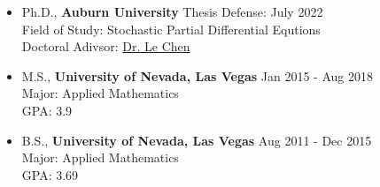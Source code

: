 \documentclass[letterpaper,12pt]{article}
\begin{document}
 \begin{itemize}
   \item  \noindent Ph.D., \textbf{Auburn University} \hfill Thesis Defense: July 2022 \\
   Field of Study: Stochastic Partial Differential Equtions  \\ 
   Doctoral Adivsor: \href{http://webhome.auburn.edu/~lzc0090/}{Dr. Le Chen}
   
   \item \noindent M.S., \textbf{University of Nevada, Las Vegas } \hfill Jan 2015 - Aug 2018 \\
   		Major: Applied Mathematics \\ 
   		GPA: 3.9
   		
   	\item \noindent B.S., \textbf{University of Nevada, Las Vegas} \hfill Aug 2011 - Dec 2015 \\
   	    	Major: Applied Mathematics \\ 
   	     	GPA: 3.69 \\

     \end{itemize}
	
%      
%      

\end{document}
